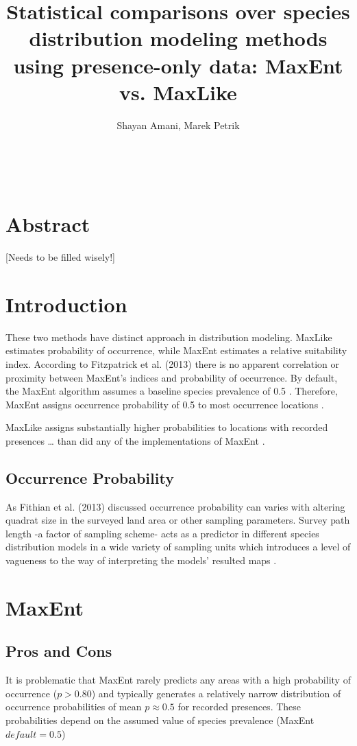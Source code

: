 \documentclass{article}
\begin{document}
\title{Statistical comparisons over species distribution modeling methods using presence-only data: MaxEnt vs. MaxLike}
\author{Shayan Amani, Marek Petrik}
\maketitle\

\section*{Abstract}
[Needs to be filled wisely!]

\section*{Introduction}
These two methods have distinct approach in distribution modeling. MaxLike estimates probability of occurrence, while MaxEnt estimates a relative suitability index. According to Fitzpatrick et al. (2013) there is no apparent correlation or proximity between MaxEnt’s indices and probability of occurrence. By default, the MaxEnt algorithm assumes a baseline species prevalence of 0.5 \cite{Phillips2008}. Therefore, MaxEnt assigns occurrence probability of 0.5 to most occurrence locations \cite{FitzpatrickMC;GotelliNJ;Ellison2013}.

MaxLike assigns substantially higher probabilities to locations with recorded presences … than did any of the implementations of MaxEnt \cite{FitzpatrickMC;GotelliNJ;Ellison2013}.

\subsection*{Occurrence Probability}
As Fithian et al. (2013) discussed occurrence probability can varies with altering quadrat size in the surveyed land area or other sampling parameters. Survey path length -a factor of sampling scheme- acts as a predictor in different species distribution models in a wide variety of sampling units which introduces a level of vagueness to the way of interpreting the models' resulted maps \cite{Fithian2013}.

\section*{MaxEnt}

\subsection*{Pros and Cons}
It is problematic that MaxEnt rarely predicts any areas with a high probability of occurrence ($p > 0.80$) and typically generates a relatively narrow distribution of occurrence probabilities of mean $p \approx 0.5$ for recorded presences. These probabilities depend on the assumed value of species prevalence (MaxEnt $default = 0.5$) \cite{FitzpatrickMC;GotelliNJ;Ellison2013}
\end{document}
